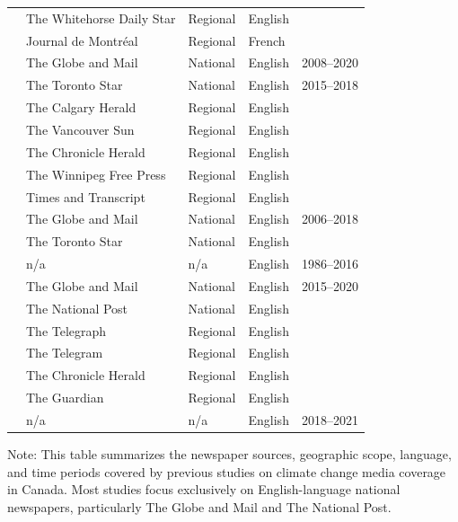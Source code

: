 \documentclass[12pt]{article}
\renewcommand\_{\texttt{\detokenize{_}\allowbreak}}
\begin{document}
{\begin{longtable}{p{5cm}p{6cm}p{4cm}p{3cm}p{3.5cm}}
& The Whitehorse Daily Star & Regional & English & \\
& Journal de Montréal & Regional & French & \\
\midrule
\textcite{pillod_reframing_2021} & The Globe and Mail & National & English & 2008--2020 \\
\midrule
\textcite{brandt_news_2021} & The Toronto Star & National & English & 2015--2018 \\
& The Calgary Herald & Regional & English & \\
& The Vancouver Sun & Regional & English & \\
& The Chronicle Herald & Regional & English & \\
& The Winnipeg Free Press & Regional & English & \\
& Times and Transcript & Regional & English & \\
\midrule
\textcite{hase_climate_2021} & The Globe and Mail & National & English & 2006--2018 \\
& The Toronto Star & National & English & \\
\midrule
\textcite{sachdeva_themes_2022} & n/a & n/a & English & 1986--2016 \\
\midrule
\textcite{stoddart_what_2023} & The Globe and Mail & National & English & 2015--2020 \\
& The National Post & National & English & \\
& The Telegraph & Regional & English & \\
& The Telegram & Regional & English & \\
& The Chronicle Herald & Regional & English & \\
& The Guardian & Regional & English & \\
\midrule
\textcite{chen_how_2023} & n/a & n/a & English & 2018--2021 \\
\bottomrule
\end{longtable}
}

\vspace{0.5em}
\noindent\footnotesize
Note: This table summarizes the newspaper sources, geographic scope, language, and time periods covered by previous studies on climate change media coverage in Canada. Most studies focus exclusively on English-language national newspapers, particularly The Globe and Mail and The National Post.
\endlandscape
\end{document}
